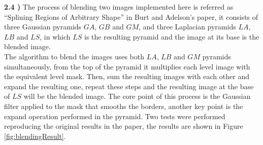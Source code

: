 \documentclass[12pt,a4paper]{article}
\begin{document}
\textbf{2.4 )} The process of blending two images implemented here is referred as ``Splining Regions of Arbitrary Shape'' in Burt and Adelson's paper, it consists of three Gaussian pyramids $GA$, $GB$ and $GM$, and three Laplacian pyramids $LA$, $LB$ and $LS$, in which $LS$ is the resulting pyramid and the image at its base is the blended image.  \\

The algorithm to blend the images uses both $LA$, $LB$ and $GM$ pyramids simultaneously, from the top of the pyramid it multiplies each level image with the equivalent level mask. Then, sum the resulting images with each other and expand the resulting one, repeat these steps and the resulting image at the base of $LS$ will be the blended image. The core point of this process is the Gaussian filter applied to the mask that smooths the borders, another key point is the expand operation performed in the pyramid. Two tests were performed reproducing the original results in the paper, the results are shown in  Figure \ref{fig:blendingResult}. \\
\end{document}

